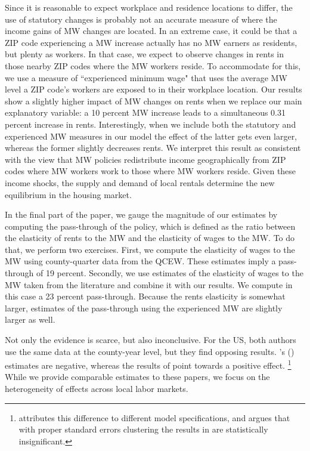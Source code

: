 Since it is reasonable to expect workplace and residence locations to differ, the use of 
statutory changes is probably not an accurate measure of where the income gains of MW 
changes are located.
In an extreme case, it could be that a ZIP code experiencing a MW increase actually has 
no MW earners as residents, but plenty as workers.
In that case, we expect to observe changes in rents in those nearby ZIP codes where the 
MW workers reside.
To accommodate for this, we use a measure of ``experienced minimum wage" that uses the 
average MW level a ZIP code's workers are exposed to in their workplace location.
Our results show a slightly higher impact of MW changes on rents when we replace our main 
explanatory variable: a 10 percent MW increase leads to a simultaneous 0.31 percent 
increase in rents.
Interestingly, when we include both the statutory and experienced MW measures in our 
model the effect of the latter gets even larger, whereas the former slightly decreases 
rents.
We interpret this result as consistent with the view that MW policies redistribute income 
geographically from ZIP codes where MW workers work to those where MW workers reside.
Given these income shocks, the supply and demand of local rentals determine the new 
equilibrium in the housing market.

In the final part of the paper, we gauge the magnitude of our estimates by computing the 
pass-through of the policy, which is defined as the ratio between the elasticity of rents 
to the MW and the elasticity of wages to the MW.
To do that, we perform two exercises.
First, we compute the elasticity of wages to the MW using county-quarter data from the 
QCEW. These estimates imply a pass-through of 19 percent.
Secondly, we use estimates of the elasticity of wages to the MW taken from the literature 
and combine it with our results. We compute in this case a 23 percent pass-through.
Because the rents elasticity is somewhat larger, estimates of the pass-through using the 
experienced MW are slightly larger as well.


Not only the evidence is scarce, but also inconclusive. For the US, both authors use the 
same data at the county-year level, but they find opposing results.
\citeauthor{Tidemann2018}'s (\citeyear{Tidemann2018}) estimates are 
negative, whereas the results of \textcite{Yamagishi2019} point towards a positive 
effect.%
\footnote{\textcite{Yamagishi2019} attributes this difference to different model 
specifications, and argues that with proper standard errors clustering the results 
in \textcite{Tidemann2018} are statistically insignificant.}
While we provide comparable estimates to these papers, we focus on the heterogeneity
of effects across local labor markets.

